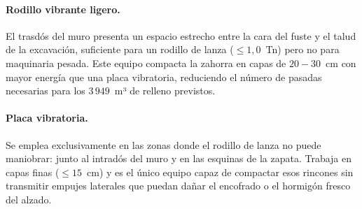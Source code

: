 \paragraph{Rodillo vibrante ligero.}
El trasdós del muro presenta un espacio estrecho entre la cara del fuste y el
talud de la excavación, suficiente para un rodillo de lanza ($\leq 1{,}0$~Tn) pero
no para maquinaria pesada. Este equipo compacta la zahorra en capas de
$20{-}30$~cm con mayor energía que una placa vibratoria, reduciendo el número de
pasadas necesarias para los $3\,949$~m³ de relleno previstos.

\paragraph{Placa vibratoria.}
Se emplea exclusivamente en las zonas donde el rodillo de lanza no puede maniobrar:
junto al intradós del muro y en las esquinas de la zapata. Trabaja en capas finas
($\leq 15$~cm) y es el único equipo capaz de compactar esos rincones sin transmitir
empujes laterales que puedan dañar el encofrado o el hormigón fresco del alzado.
